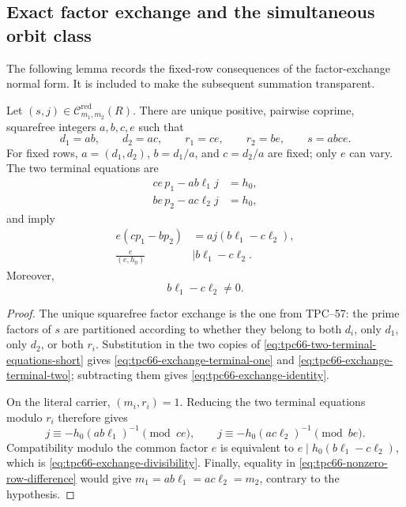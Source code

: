 \subsection{Exact factor exchange and the simultaneous orbit class}

The following lemma records the fixed-row consequences of the
factor-exchange normal form.  It is included to make the subsequent
summation transparent.

\begin{lemma}
\label{lem:tpc66-fixed-row-exchange}
Let \((s,j)\in\mathcal C^{\mathrm{red}}_{m_1,m_2}(R)\).  There are unique
positive, pairwise coprime, squarefree integers \(a,b,c,e\) such that
\begin{equation}
 d_1=ab,\qquad d_2=ac,\qquad
 r_1=ce,\qquad r_2=be,\qquad
 s=abce.
 \label{eq:tpc66-factor-exchange}
\end{equation}
For fixed rows, \(a=(d_1,d_2)\), \(b=d_1/a\), and \(c=d_2/a\) are fixed;
only \(e\) can vary.  The two terminal equations are
\begin{align}
 ce\,p_1-ab\ell_1j&=h_0,
 \label{eq:tpc66-exchange-terminal-one}\\
 be\,p_2-ac\ell_2j&=h_0,
 \label{eq:tpc66-exchange-terminal-two}
\end{align}
and imply
\begin{align}
 e(cp_1-bp_2)
 &=aj(b\ell_1-c\ell_2),
 \label{eq:tpc66-exchange-identity}\\
 \frac{e}{(e,h_0)}
 &\mid b\ell_1-c\ell_2.
 \label{eq:tpc66-exchange-divisibility}
\end{align}
Moreover,
\begin{equation}
 b\ell_1-c\ell_2\ne0.
 \label{eq:tpc66-nonzero-row-difference}
\end{equation}
\end{lemma}

\begin{proof}
The unique squarefree factor exchange is the one from TPC--57:
the prime factors of \(s\) are partitioned according to whether they
belong to both \(d_i\), only \(d_1\), only \(d_2\), or both \(r_i\).
Substitution in the two copies of
\eqref{eq:tpc66-two-terminal-equations-short} gives
\eqref{eq:tpc66-exchange-terminal-one} and
\eqref{eq:tpc66-exchange-terminal-two}; subtracting them gives
\eqref{eq:tpc66-exchange-identity}.

On the literal carrier, \((m_i,r_i)=1\).  Reducing the two terminal
equations modulo \(r_i\) therefore gives
\[
 j\equiv-h_0(ab\ell_1)^{-1}\pmod{ce},
 \qquad
 j\equiv-h_0(ac\ell_2)^{-1}\pmod{be}.
 \]
Compatibility modulo the common factor \(e\) is equivalent to
\(e\mid h_0(b\ell_1-c\ell_2)\), which is
\eqref{eq:tpc66-exchange-divisibility}.  Finally, equality in
\eqref{eq:tpc66-nonzero-row-difference} would give
\(m_1=ab\ell_1=ac\ell_2=m_2\), contrary to the hypothesis.
\end{proof}

